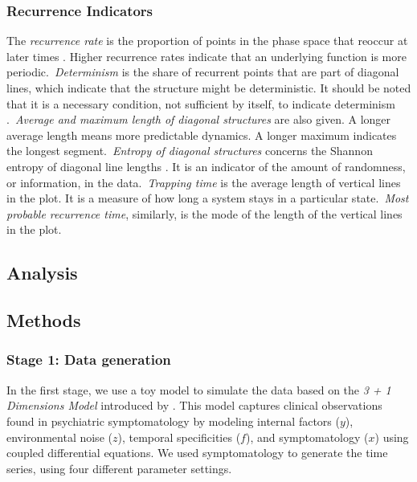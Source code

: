 \documentclass[utf8]{FrontiersinVancouver}
\begin{document}
\subsubsection{Recurrence Indicators}

The \textit{recurrence rate} is the proportion of points in the phase space that reoccur at later times \citep{webber2005recurrence}. Higher recurrence rates indicate that an underlying function is more periodic.\ \textit{Determinism} is the share of recurrent points that are part of diagonal lines, which indicate that the structure might be deterministic. It should be noted that it is a necessary condition, not sufficient by itself, to indicate determinism \citep{marwanHowAvoidPotential2011}.\ \textit{Average and maximum length of diagonal structures} are also given. A longer average length means more predictable dynamics. A longer maximum indicates the longest segment.\  \textit{Entropy of diagonal structures} concerns the Shannon entropy of diagonal line lengths \citep{kraemerRecurrenceThresholdSelection2018}. It is an indicator of the amount of randomness, or information, in the data.\ \textit{Trapping time} is the average length of vertical lines in the plot. It is a measure of how long a system stays in a particular state.\ \textit{Most probable recurrence time}, similarly, is the mode of the length of the vertical lines in the plot. 

\subsection{Analysis}

\subsection{Methods}

\subsubsection{Stage 1: Data generation}

In the first stage, we use a toy model to simulate the data based on the \textit{3 + 1 Dimensions Model} introduced by \citep{gauldDynamicalSystemsComputational2023}. This model captures clinical observations found in psychiatric symptomatology by modeling internal factors ($y$), environmental noise ($z$), temporal specificities ($f$), and symptomatology ($x$) using coupled differential equations. We used symptomatology to generate the time series, using four different parameter settings.
\end{document}
